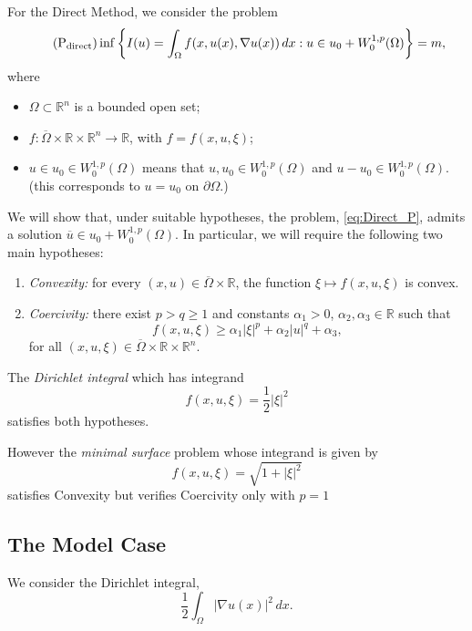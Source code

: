 For the Direct Method, we consider the problem
\[
\tag{$\text{P}_\text{direct}$}
\inf \left\{ I(u) = \int_\Omega f(x,u(x),\nabla u(x))\,dx
: u\in u_0+W_0^{1,p}(\Omega) \right\}=m,
\label{eq:Direct_P}
\]
where
\begin{itemize}
\item $\Omega\subset\mathbb{R}^n$ is a bounded open set;
\item $f:\overline{\Omega}\times\mathbb{R}\times\mathbb{R}^n\rightarrow\mathbb{R}$, with $f=f(x,u,\xi)$;
\item $u \in u_0\in W^{1,p}_0(\Omega)$ means that $u,u_0\in W_0^{1,p}(\Omega)$ and $u-u_0\in W_0^{1,p}(\Omega)$. (this corresponds to $u=u_0$ on $\partial\Omega$.)
\end{itemize}
We will show that, under suitable hypotheses, the problem, \ref{eq:Direct_P}, admits a solution $\overline{u}\in u_0+W_0^{1,p}(\Omega)$. In particular, we will require the following two main hypotheses:
\begin{enumerate}
\item \textit{Convexity:} for every $(x,u)\in\overline{\Omega}\times\mathbb{R}$, the function
\(    \xi\mapsto f(x,u,\xi)
   \)
is convex.
\item \textit{Coercivity:} there exist $p>q\geq1$ and constants $\alpha_1>0$, $\alpha_2,\alpha_3\in\mathbb{R}$ such that
\[
f(x,u,\xi)
\geq
\alpha_1|\xi|^p+\alpha_2|u|^q+\alpha_3,
\]
for all $(x,u,\xi)\in\overline{\Omega}\times\mathbb{R}\times\mathbb{R}^n$.
\end{enumerate}


The \textit{Dirichlet integral} which has integrand
\[
f(x,u,\xi) = \frac{1}{2}|\xi|^2
\]
satisfies both hypotheses.

However the \textit{minimal surface} problem whose integrand is given by
$$
f(x,u, \xi) = \sqrt{1+|\xi|^2}
$$
satisfies Convexity but verifies Coercivity only with $p =1$

\subsection{The Model Case}

We consider the Dirichlet integral, 
\begin{equation}
\label{The Dirichlet Integral}
\frac{1}{2} \int_\Omega  |\nabla u(x)|^2 \, dx.
\end{equation}

